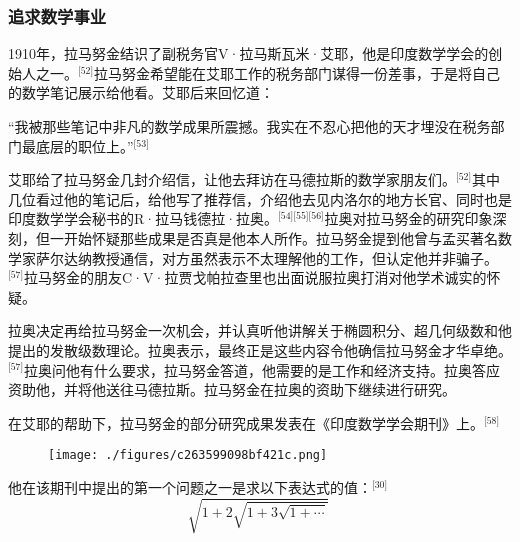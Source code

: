 \subsubsection{追求数学事业}
1910年，拉马努金结识了副税务官V·拉马斯瓦米·艾耶，他是印度数学学会的创始人之一。\(^\text{[52]}\)拉马努金希望能在艾耶工作的税务部门谋得一份差事，于是将自己的数学笔记展示给他看。艾耶后来回忆道：

“我被那些笔记中非凡的数学成果所震撼。我实在不忍心把他的天才埋没在税务部门最底层的职位上。”\(^\text{[53]}\)

艾耶给了拉马努金几封介绍信，让他去拜访在马德拉斯的数学家朋友们。\(^\text{[52]}\)其中几位看过他的笔记后，给他写了推荐信，介绍他去见内洛尔的地方长官、同时也是印度数学学会秘书的R·拉马钱德拉·拉奥。\(^\text{[54][55][56]}\)拉奥对拉马努金的研究印象深刻，但一开始怀疑那些成果是否真是他本人所作。拉马努金提到他曾与孟买著名数学家萨尔达纳教授通信，对方虽然表示不太理解他的工作，但认定他并非骗子。\(^\text{[57]}\)拉马努金的朋友C·V·拉贾戈帕拉查里也出面说服拉奥打消对他学术诚实的怀疑。

拉奥决定再给拉马努金一次机会，并认真听他讲解关于椭圆积分、超几何级数和他提出的发散级数理论。拉奥表示，最终正是这些内容令他确信拉马努金才华卓绝。\(^\text{[57]}\)拉奥问他有什么要求，拉马努金答道，他需要的是工作和经济支持。拉奥答应资助他，并将他送往马德拉斯。拉马努金在拉奥的资助下继续进行研究。

在艾耶的帮助下，拉马努金的部分研究成果发表在《印度数学学会期刊》上。\(^\text{[58]}\)
\begin{figure}[ht]
\centering
\texttt{[image: ./figures/c263599098bf421c.png]}
\caption{} \label{fig_LMLJ_4}
\end{figure}
他在该期刊中提出的第一个问题之一是求以下表达式的值：\(^\text{[30]}\)
$$
\sqrt{1 + 2 \sqrt{1 + 3 \sqrt{1 + \cdots}}}~
$$
